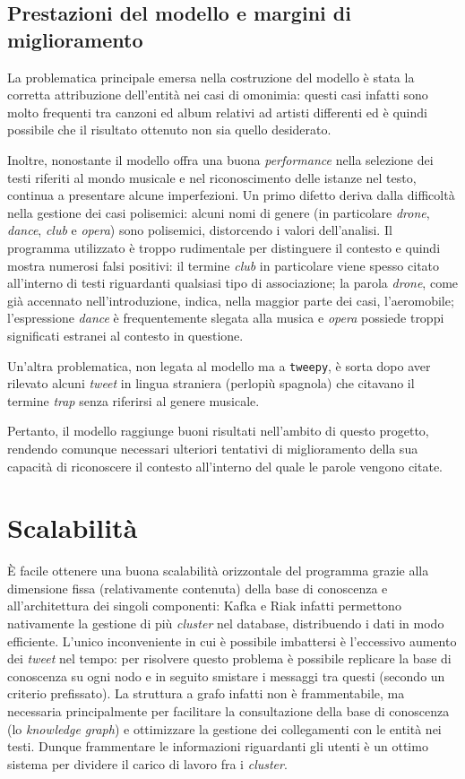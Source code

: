 \documentclass[12pt, a4paper, twocolumn]{article} %
\begin{document}
\subsection{Prestazioni del modello e margini di miglioramento}
La problematica principale emersa nella costruzione del modello è stata la corretta attribuzione dell'entità nei casi di omonimia: questi casi infatti sono molto frequenti tra canzoni ed album relativi ad artisti differenti ed è quindi possibile che il risultato ottenuto non sia quello desiderato.

Inoltre, nonostante il modello offra una buona \textit{performance} nella selezione dei testi riferiti al mondo musicale e nel riconoscimento delle istanze nel testo, continua a presentare alcune imperfezioni.
Un primo difetto deriva dalla difficoltà nella gestione dei casi polisemici: alcuni nomi di genere (in particolare \textit{drone}, \textit{dance}, \textit{club} e \textit{opera}) sono polisemici, distorcendo i valori dell'analisi.
Il programma utilizzato è troppo rudimentale per distinguere il contesto e quindi mostra numerosi falsi positivi: il termine \textit{club} in particolare viene spesso citato all'interno di testi riguardanti qualsiasi tipo di associazione; la parola \textit{drone}, come già accennato nell'introduzione, indica, nella maggior parte dei casi, l'aeromobile; l'espressione \textit{dance} è frequentemente slegata alla musica e \textit{opera} possiede troppi significati estranei al contesto in questione.

Un'altra problematica, non legata al modello ma a \verb|tweepy|, è sorta dopo aver rilevato alcuni \textit{tweet} in lingua straniera (perlopiù spagnola) che citavano il termine \textit{trap} senza riferirsi al genere musicale.

Pertanto, il modello raggiunge buoni risultati nell'ambito di questo progetto, rendendo comunque necessari ulteriori tentativi di miglioramento della sua capacità di riconoscere il contesto all'interno del quale le parole vengono citate.

\section{Scalabilità}
È facile ottenere una buona scalabilità orizzontale del programma grazie alla dimensione fissa (relativamente contenuta) della base di conoscenza e all'architettura dei singoli componenti: Kafka e Riak infatti permettono nativamente la gestione di più \textit{cluster} nel database, distribuendo i dati in modo efficiente.
L'unico inconveniente in cui è possibile imbattersi è l'eccessivo aumento dei \textit{tweet} nel tempo: per risolvere questo problema è possibile replicare la base di conoscenza su ogni nodo e in seguito smistare i messaggi tra questi (secondo un criterio prefissato).
La struttura a grafo infatti non è frammentabile, ma necessaria principalmente per facilitare la consultazione della base di conoscenza (lo \textit{knowledge graph}) e ottimizzare la gestione dei collegamenti con le entità nei testi.
Dunque frammentare le informazioni riguardanti gli utenti è un ottimo sistema per dividere il carico di lavoro fra i \textit{cluster}.
\end{document}
